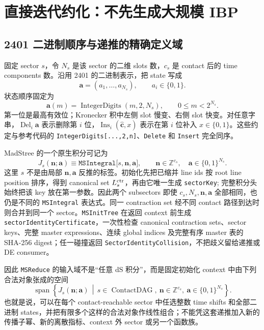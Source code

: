 \documentclass[11pt,a4paper]{ctexart}
\begin{document}
\section{直接迭代约化：不先生成大规模 IBP}

\subsection{2401 二进制顺序与递推的精确定义域}

固定 sector $s$，令 $N_s$ 是该 sector 的二维 slots 数，$c_s$ 是 contact 后的 time components 数。沿用 2401 的二进制表示，把 state 写成
\begin{equation}
 \bm a=(a_1,\ldots,a_{N_s}),
 \qquad a_i\in\{0,1\}.
\end{equation}
状态顺序固定为
\begin{equation}
 \bm a(m)=\operatorname{IntegerDigits}(m,2,N_s),
 \qquad 0\leq m<2^{N_s}.
 \label{eq:binary-state-order}
\end{equation}
第一位是最高有效位；Kronecker 积中左侧 slot 慢变、右侧 slot 快变。对任意字串，$\operatorname{Del}_i\bm a$ 表示删除第 $i$ 位，$\operatorname{Ins}_i(\widehat{\bm c},x)$ 表示在第 $i$ 位补入 $x\in\{0,1\}$。这些约定与参考代码的 \texttt{IntegerDigits[...,2,n]}、\texttt{Delete} 和 \texttt{Insert} 完全同序。

MadStree 的一个原生积分可记为
\begin{equation}
 J_s(\bm n;\bm a)
 \equiv\texttt{MSIntegral[}s,\bm n,\bm a\texttt{]},
 \qquad
 \bm n\in\mathbb Z^{c_s},
 \quad
 \bm a\in\{0,1\}^{N_s}.
 \label{eq:MSIntegral-domain}
\end{equation}
这里 $s$ 不是由局部 $\bm n,\bm a$ 反推的标签。初始化先把已缩并 line ids 按 root line position 排序，得到 canonical set $L_s^{\rm ctr}$，再由它唯一生成
\texttt{sectorKey}; 完整积分头始终把该 key 放在第一参数。因此两个 subsectors 即使 $c_s,N_s,\bm n,\bm a$ 全部相同，也仍是不同的
\texttt{MSIntegral} 表达式。同一 contraction set 经不同 contact 路径到达时则合并到同一个 sector。\texttt{MSInitTree} 在返回 context 前生成
\texttt{sectorIdentityCertificate}，一次性检查 canonical contraction sets、sector keys、完整 master expressions、连续 global indices 及完整有序 master 表的 SHA-256 digest；任一碰撞返回
\texttt{SectorIdentityCollision}，不把歧义留给递推或 DE consumer。

因此 \texttt{MSReduce} 的输入域不是“任意 dS 积分”，而是固定初始化 context 中由下列合法对象张成的空间
\begin{equation}
 \boxed{
 \operatorname{span}\!\left\{
 J_s(\bm n;\bm a)\,\middle|\,
 s\in\operatorname{ContactDAG},\
 \bm n\in\mathbb Z^{c_s},\
 \bm a\in\{0,1\}^{N_s}
 \right\}.
 }
 \label{eq:MSReduce-domain}
\end{equation}
也就是说，可以在每个 contact-reachable sector 中任选整数 time shifts 和全部二进制 states，并把有限多个这样的合法对象作线性组合；不能凭这套递推加入新的传播子幂、新的离散指标、context 外 sector 或另一个函数族。
\end{document}
